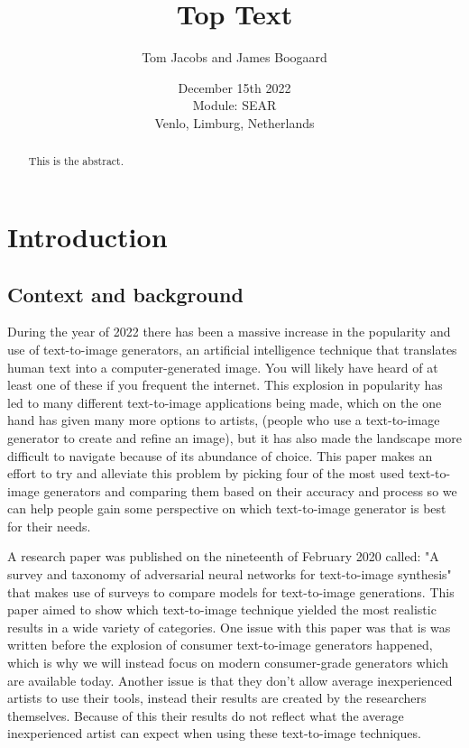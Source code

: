 \documentclass[]{report}
\title{Top Text}
\author{Tom Jacobs and James Boogaard}
\date{December 15th 2022 \\Module: SEAR \\Venlo, Limburg, Netherlands}
\begin{document}
	
	\maketitle
	
	\begin{abstract}
		This is the abstract.
		
		
	\end{abstract}
	
	\tableofcontents
	\setcounter{page}{3}
	\listoffigures %
	\pagebreak
	
	
	\section{Introduction}
	
	\subsection{Context and background}
During the year of 2022 there has been a massive increase in the popularity and use of text-to-image generators, an artificial intelligence technique that translates human text into a computer-generated image. You will likely have heard of at least one of these if you frequent the internet. This explosion in popularity has led to many different text-to-image applications being made, which on the one hand has given many more options to artists, (people who use a text-to-image generator to create and refine an image), but it has also made the landscape more difficult to navigate because of its abundance of choice. This paper makes an effort to try and alleviate this problem by picking four of the most used text-to-image generators and comparing them based on their accuracy and process so we can help people gain some perspective on which text-to-image generator is best for their needs.

A research paper was published on the nineteenth of February 2020 called: "A survey and taxonomy of adversarial neural networks for text-to-image synthesis" that makes use of surveys to compare models for text-to-image generations. This paper aimed to show which text-to-image technique yielded the most realistic results in a wide variety of categories. One issue with this paper was that is was written before the explosion of consumer text-to-image generators happened, which is why we will instead focus on modern consumer-grade generators which are available today. Another issue is that they don't allow average inexperienced artists to use their tools, instead their results are created by the researchers themselves. Because of this their results do not reflect what the average inexperienced artist can expect when using these text-to-image techniques. 
\end{document}
